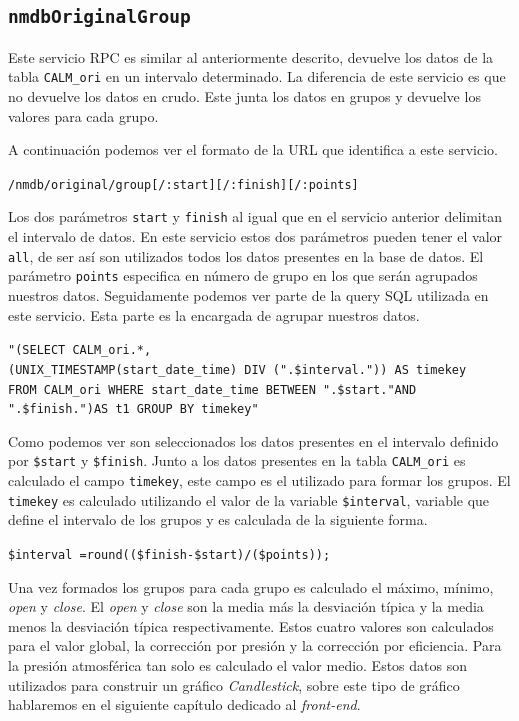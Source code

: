 	\subsection{\texttt{nmdbOriginalGroup}}
		Este servicio RPC es similar al anteriormente descrito, devuelve los datos de la tabla \texttt{CALM\_ori} en un intervalo determinado.
		La diferencia de este servicio es que no devuelve los datos en crudo. Este junta los datos en grupos y devuelve los valores para cada
		grupo. 
		\par
		A continuación podemos ver el formato de la URL que identifica a este servicio.
			\begin{center} \texttt{/nmdb/original/group[/:start][/:finish][/:points]}  \end{center} 
		Los dos parámetros \texttt{start} y \texttt{finish} al igual que en el servicio anterior delimitan el intervalo de datos. En este
		servicio estos dos parámetros pueden tener el valor \texttt{all}, de ser así son utilizados todos los datos presentes en la base de
		datos. El parámetro \texttt{points} especifica en número de grupo en los que serán agrupados nuestros datos. Seguidamente podemos ver
		parte de la query SQL utilizada en este servicio. Esta parte es la encargada de agrupar nuestros datos.
			\begin{center} \texttt{"(SELECT CALM\_ori.*,
			  		\\	(UNIX\_TIMESTAMP(start\_date\_time) DIV (".\$interval.")) AS timekey  
				      	\\	FROM CALM\_ori WHERE start\_date\_time BETWEEN \cc".\$start."\cc AND \cc".\$finish."\cc)AS t1  GROUP BY timekey"}
			\end{center} 
		Como podemos ver son seleccionados los datos presentes en el intervalo definido por \texttt{\$start} y \texttt{\$finish}. Junto a los
		datos presentes en la tabla \texttt{CALM\_ori} es calculado el campo \texttt{timekey}, este campo es el utilizado para formar los
		grupos. El \texttt{timekey} es calculado utilizando el valor de la variable \texttt{\$interval}, variable que define el intervalo de
		los grupos y es calculada de la siguiente forma.
			\begin{center} \texttt{\$interval =round((\$finish-\$start)/(\$points));}  \end{center} 
		Una vez formados los grupos para cada grupo es calculado el máximo, mínimo, \emph{open} y \emph{close}. El \emph{open} y \emph{close}
		son la media más la desviación típica y la media menos la desviación típica respectivamente. Estos cuatro valores son calculados para
		el valor global, la corrección por presión y la corrección por eficiencia. Para la presión atmosférica tan solo es calculado el valor
		medio. Estos datos son utilizados para construir un gráfico \emph{Candlestick}, sobre este tipo de gráfico hablaremos en el siguiente
		capítulo dedicado al \emph{front-end}.
